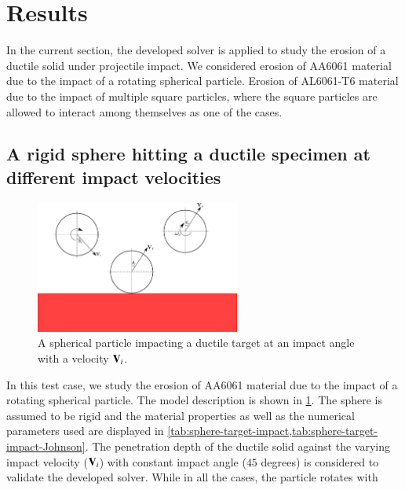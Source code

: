 \FloatBarrier%
\section{Results}
\label{sec:erosion-results}
In the current section, the developed solver is applied to study the erosion of
a ductile solid under projectile impact. We considered erosion of AA6061
material due to the impact of a rotating spherical particle. Erosion of
AL6061-T6 material due to the impact of multiple square particles, where the
square particles are allowed to interact among themselves as one of the cases.


\FloatBarrier%
\subsection{A rigid sphere hitting a ductile specimen at different impact velocities}
\label{sec:erosion-vyas}
\begin{figure}[!htpb]
  \centering
  \includegraphics[width=0.6\textwidth]{images/erosion/images/vyas_2021_rebound_kinematics_3d/cao_drawing}
  \caption{A spherical particle impacting a ductile target at an impact angle
    with a velocity $\mathbf{V}_i$.}
\label{fig:results-cao-3d-erosion-schematic}
\end{figure}
In this test case, we study the erosion of AA6061 material due to the impact of
a rotating spherical particle. The model description is shown in
\cref{fig:results-cao-3d-erosion-schematic}. The sphere is assumed to be rigid
and the material properties as well as the numerical parameters used are
displayed in \cref{tab:sphere-target-impact,tab:sphere-target-impact-Johnson}.
The penetration depth of the ductile solid against the varying impact velocity
($\mathbf{V}_i$) with constant impact angle ($45$ degrees) is considered to
validate the developed solver. While in all the cases, the particle rotates with
